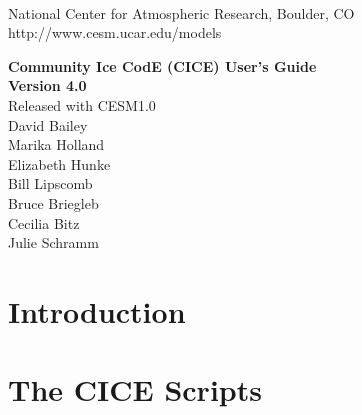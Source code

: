 \documentclass[]{article}
\newif\ifpdf
\begin{document}
\ifpdf
\else
{}
\fi

 \newenvironment{Ventry}[1]%
   {\begin{list}{}{\renewcommand{\makelabel}[1]{\textsf{##1:}\hfil}%
      \settowidth{\labelwidth}{\textsf{#1:}}%
      \setlength{\leftmargin}{1.5cm}%
      \setlength{\labelwidth}{1.0cm}%
      \setlength{\itemsep}{0pt}%
      \setlength{\parsep}{0pt}}}%
   {\end{list}}

\begin{titlepage}

 \\
\noindent National Center for Atmospheric Research, Boulder, CO \\
\noindent http://www.cesm.ucar.edu/models \\
\vspace{2in}

\begin{center}
{\Large
  {\bf Community Ice CodE (CICE) User's Guide} \\
  {\bf Version 4.0} \\
  \vspace{0.2in}
  {Released with CESM1.0} \\
  \vspace{0.5in}
  David Bailey \\
  Marika Holland \\
  Elizabeth Hunke \\
  Bill Lipscomb \\
  Bruce Briegleb \\
  Cecilia Bitz  \\
  Julie Schramm \\
}
\end{center}

\end{titlepage}

\tableofcontents

\newpage
\section{Introduction}
  

\section{The CICE Scripts}
    
\end{document}
